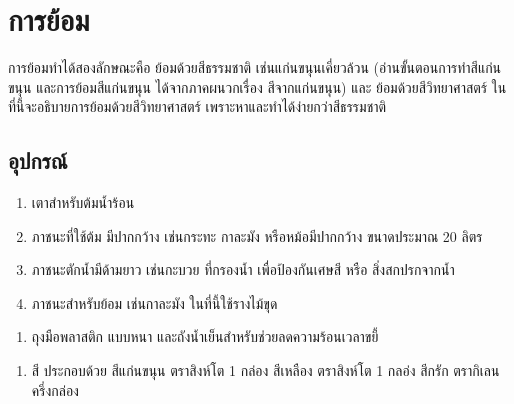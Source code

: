 \chapter{การย้อม}

การย้อมทำได้สองลักษณะคือ ย้อมด้วยสีธรรมชาติ เช่นแก่นขนุนเคี่ยวล้วน
(อ่านขั้นตอนการทำสีแก่นขนุน และการย้อมสีแก่นขนุน ได้จากภาคผนวกเรื่อง
สีจากแก่นขนุน) และ ย้อมด้วยสีวิทยาศาสตร์
ในที่นี้จะอธิบายการย้อมด้วยสีวิทยาศาสตร์
เพราะหาและทำได้ง่ายกว่าสีธรรมชาติ

\section{อุปกรณ์}

\begin{enumerate}
\def\labelenumi{(\arabic{enumi})}
\item
  เตาสำหรับต้มน้ำร้อน
\item
  ภาชนะที่ใช้ต้ม มีปากกว้าง เช่นกระทะ กาละมัง หรือหม้อมีปากกว้าง
  ขนาดประมาณ 20 ลิตร
\item
  ภาชนะตักน้ำมีด้ามยาว เช่นกะบวย ที่กรองน้ำ เพื่อป้องกันเศษสี หรือ
  สิ่งสกปรกจากน้ำ
\item
  ภาชนะสำหรับย้อม เช่นกาละมัง ในที่นี้ใช้รางไม้ขุด
\end{enumerate}

\setlength{\nextPhotoWidth}{0.5\textwidth}





\begin{enumerate}
\def\labelenumi{(\arabic{enumi})}
\setcounter{enumi}{4}
\tightlist
\item
  ถุงมือพลาสติก แบบหนา และถังน้ำเย็นสำหรับช่วยลดความร้อนเวลาขยี้
\end{enumerate}



\clearpage

\begin{enumerate}
\def\labelenumi{(\arabic{enumi})}
\setcounter{enumi}{5}
\tightlist
\item
  สี ประกอบด้วย สีแก่นขนุน ตราสิงห์โต 1 กล่อง สีเหลือง ตราสิงห์โต 1
  กลอ่ง สีกรัก ตรากิเลน ครึ่งกล่อง
\end{enumerate}

